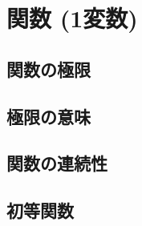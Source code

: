 \documentclass[a4paper]{ltjsarticle}
\begin{document}
 \section{関数 (1変数)}
  \subsection{関数の極限}
  \subsection{極限の意味}
  \subsection{関数の連続性}
  \subsection{初等関数}
\end{document}
